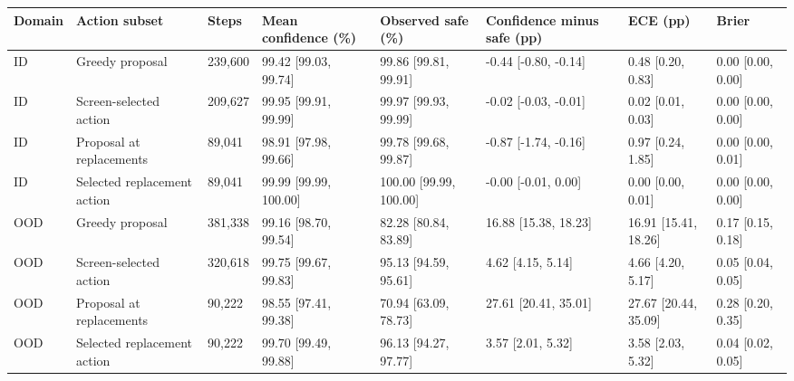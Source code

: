 \begin{tabular}{llllllll}
\toprule
Domain & Action subset & Steps & Mean confidence (\%) & Observed safe (\%) & Confidence minus safe (pp) & ECE (pp) & Brier \\
\midrule
ID & Greedy proposal & 239,600 & 99.42 [99.03, 99.74] & 99.86 [99.81, 99.91] & -0.44 [-0.80, -0.14] & 0.48 [0.20, 0.83] & 0.00 [0.00, 0.00] \\
ID & Screen-selected action & 209,627 & 99.95 [99.91, 99.99] & 99.97 [99.93, 99.99] & -0.02 [-0.03, -0.01] & 0.02 [0.01, 0.03] & 0.00 [0.00, 0.00] \\
ID & Proposal at replacements & 89,041 & 98.91 [97.98, 99.66] & 99.78 [99.68, 99.87] & -0.87 [-1.74, -0.16] & 0.97 [0.24, 1.85] & 0.00 [0.00, 0.01] \\
ID & Selected replacement action & 89,041 & 99.99 [99.99, 100.00] & 100.00 [99.99, 100.00] & -0.00 [-0.01, 0.00] & 0.00 [0.00, 0.01] & 0.00 [0.00, 0.00] \\
OOD & Greedy proposal & 381,338 & 99.16 [98.70, 99.54] & 82.28 [80.84, 83.89] & 16.88 [15.38, 18.23] & 16.91 [15.41, 18.26] & 0.17 [0.15, 0.18] \\
OOD & Screen-selected action & 320,618 & 99.75 [99.67, 99.83] & 95.13 [94.59, 95.61] & 4.62 [4.15, 5.14] & 4.66 [4.20, 5.17] & 0.05 [0.04, 0.05] \\
OOD & Proposal at replacements & 90,222 & 98.55 [97.41, 99.38] & 70.94 [63.09, 78.73] & 27.61 [20.41, 35.01] & 27.67 [20.44, 35.09] & 0.28 [0.20, 0.35] \\
OOD & Selected replacement action & 90,222 & 99.70 [99.49, 99.88] & 96.13 [94.27, 97.77] & 3.57 [2.01, 5.32] & 3.58 [2.03, 5.32] & 0.04 [0.02, 0.05] \\
\bottomrule
\end{tabular}
